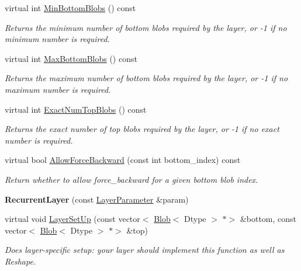 \begin{DoxyCompactItemize}
virtual int \mbox{\hyperlink{classcaffe_1_1_recurrent_layer_ac31b705bc02d333ae768f7c2184fbfae}{Min\+Bottom\+Blobs}} () const
\begin{DoxyCompactList}\small\item\em Returns the minimum number of bottom blobs required by the layer, or -\/1 if no minimum number is required. \end{DoxyCompactList}\item 
virtual int \mbox{\hyperlink{classcaffe_1_1_recurrent_layer_a983e1ead91884f9d2049a3000254961c}{Max\+Bottom\+Blobs}} () const
\begin{DoxyCompactList}\small\item\em Returns the maximum number of bottom blobs required by the layer, or -\/1 if no maximum number is required. \end{DoxyCompactList}\item 
virtual int \mbox{\hyperlink{classcaffe_1_1_recurrent_layer_a4cb9032f0942c0fef5f6c7094c7b2ab8}{Exact\+Num\+Top\+Blobs}} () const
\begin{DoxyCompactList}\small\item\em Returns the exact number of top blobs required by the layer, or -\/1 if no exact number is required. \end{DoxyCompactList}\item 
virtual bool \mbox{\hyperlink{classcaffe_1_1_recurrent_layer_a8d91610cc8b9615a1db4f07fe5590a37}{Allow\+Force\+Backward}} (const int bottom\+\_\+index) const
\begin{DoxyCompactList}\small\item\em Return whether to allow force\+\_\+backward for a given bottom blob index. \end{DoxyCompactList}\item 
\mbox{\label{classcaffe_1_1_recurrent_layer_a3f02919dbb32c07c89bfda4ea68c09df}} 
{\bfseries Recurrent\+Layer} (const \mbox{\hyperlink{classcaffe_1_1_layer_parameter}{Layer\+Parameter}} \&param)
\item 
virtual void \mbox{\hyperlink{classcaffe_1_1_recurrent_layer_a8e4537f7dd87a9cce60096e8ab04e843}{Layer\+Set\+Up}} (const vector$<$ \mbox{\hyperlink{classcaffe_1_1_blob}{Blob}}$<$ Dtype $>$ $\ast$$>$ \&bottom, const vector$<$ \mbox{\hyperlink{classcaffe_1_1_blob}{Blob}}$<$ Dtype $>$ $\ast$$>$ \&top)
\begin{DoxyCompactList}\small\item\em Does layer-\/specific setup\+: your layer should implement this function as well as Reshape. \end{DoxyCompactList}\item 

\end{DoxyCompactItemize}
